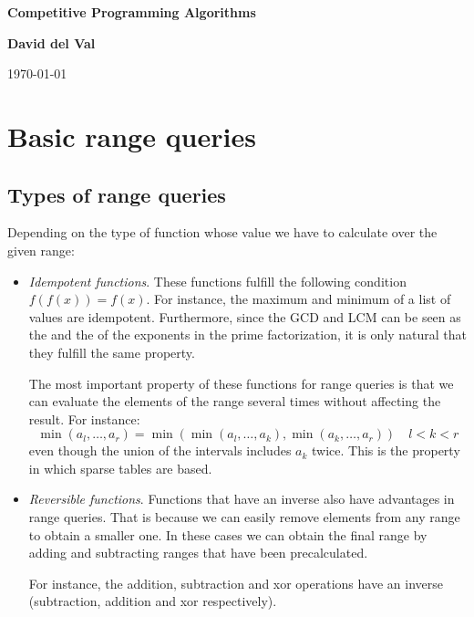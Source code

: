 \documentclass[12pt]{report}
\begin{document}
\begin{titlepage}
    \begin{center}
        \vspace*{1cm}
 
        \Huge
        \textbf{Competitive Programming Algorithms}
 

 
        \vspace{1.5cm}
 
		\Large
        \textbf{David del Val}
 
        \vfill
 
 
        \vspace{0.8cm}
 
 
        \Large
	\today
 
    \end{center}
\end{titlepage}

\setcounter{tocdepth}{2}
\tableofcontents 
\chapter{Basic range queries }

\section{Types of range queries}
Depending on the type of function whose value we have to calculate over
the given range:
\begin{itemize}
		\item \textit{Idempotent functions}. These functions fulfill the 
				following condition $f(f(x))=f(x)$. For instance, the maximum
				and minimum of a list of values are idempotent. 
				Furthermore, since the GCD and LCM can be seen as 
				the  and the  of the exponents in the
				prime factorization, it is only natural that they fulfill the same 
				property.

				The most important property of these functions for range queries
				is that we can evaluate the elements of the range several times 
				without affecting the result. For instance:
				\[
						\min(a_l,\dots ,a_r)= \min \left (
								\min (a_l, \dots,  a_k), \min (a_{k},\dots, a_r)
						\right ) \quad l < k <r
				\]
				even though the union of the intervals includes $a_k$ twice.
				This is the property in which sparse tables are based.


		\item  \textit{Reversible functions}. Functions that have an inverse
				also have advantages in range queries. That is because we
				can easily remove elements from any range to obtain a smaller
				one. In these cases we can obtain the final range by adding
				and subtracting ranges that have been precalculated.

				For instance, the addition, subtraction and xor operations have 
				an inverse (subtraction, addition and xor respectively). 

\end{itemize}
\end{document}
